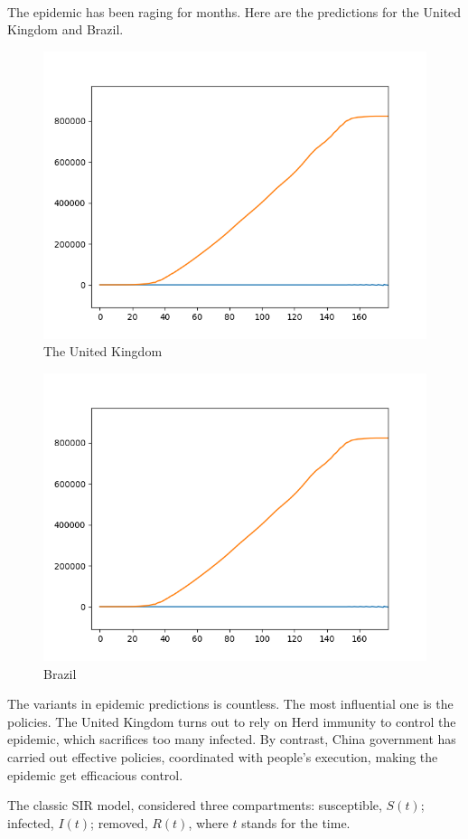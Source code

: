 \documentclass[]{article}
\begin{document}
\paragraph{}
The epidemic has been raging for months. Here are the predictions for the United Kingdom and Brazil.
\begin{figure}[H]
	\centering
	\includegraphics[width=0.7\linewidth]{Figure_England}
	\caption{The United Kingdom}
	\label{fig:figure3}
\end{figure}
\begin{figure}[H]
	\centering
	\includegraphics[width=0.7\linewidth]{Figure_England}
	\caption{Brazil}
	\label{fig:figure4}
\end{figure}
The variants in epidemic predictions is countless. The most influential one is the policies. The United Kingdom turns out to rely on Herd immunity to control the epidemic, which sacrifices too many infected. By contrast, China government has carried out effective policies, coordinated with people's execution, making the epidemic get efficacious control.
\par
The classic SIR model\cite{kermack1927a}, considered three compartments: susceptible, $S(t)$; infected, $I(t)$; removed, $R(t)$, where $t$ stands for the time. 
\end{document}
